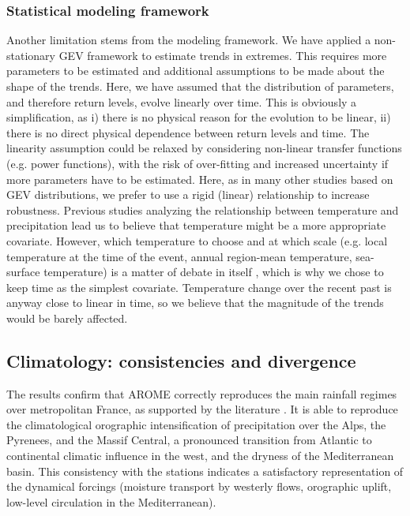 \documentclass[hess, manuscript]{copernicus}
\begin{document}
\subsubsection{Statistical modeling framework}

Another limitation stems from the modeling framework. We have applied a non-stationary GEV framework to estimate trends in extremes. This requires more parameters to be estimated and additional assumptions to be made about the shape of the trends. Here, we have assumed that the distribution of parameters, and therefore return levels, evolve linearly over time. This is obviously a simplification, as i) there is no physical reason for the evolution to be linear, ii) there is no direct physical dependence between return levels and time. The linearity assumption could be relaxed by considering non-linear transfer functions (e.g. power functions), with the risk of over-fitting and increased uncertainty if more parameters have to be estimated. Here, as in many other studies based on GEV distributions, we prefer to use a rigid (linear) relationship to increase robustness. Previous studies analyzing the relationship between temperature and precipitation \citep{DaSilva2025} lead us to believe that temperature might be a more appropriate covariate.
However, which temperature to choose and at which scale (e.g. local temperature at the time of the event, annual region-mean temperature, sea-surface temperature)  is a matter of debate in itself \citep{Schroeer2018, Dash2023, Zeder2020}, which is why we chose to keep time as the simplest covariate. Temperature change over the recent past is anyway close to linear in time, so we believe that the magnitude of the trends would be barely affected.



\subsection{Climatology: consistencies and divergence}\label{climatology-consistencies-divergence-and-limitations}

The results confirm that AROME correctly reproduces the main rainfall
regimes over metropolitan France, as supported by the literature \citep{Fumiere2020,Caillaud2021,hess-28-2579-2024,LucasPicher2024,Cortes-Hernandez2024}. It is able to reproduce the climatological orographic intensification of precipitation over the Alps,
the Pyrenees, and the Massif Central, a pronounced transition from Atlantic to continental climatic influence in the west, and the dryness of the Mediterranean
basin. This consistency with the stations indicates a satisfactory
representation of the dynamical forcings (moisture transport by westerly
flows, orographic uplift, low-level circulation in the Mediterranean).
\end{document}
